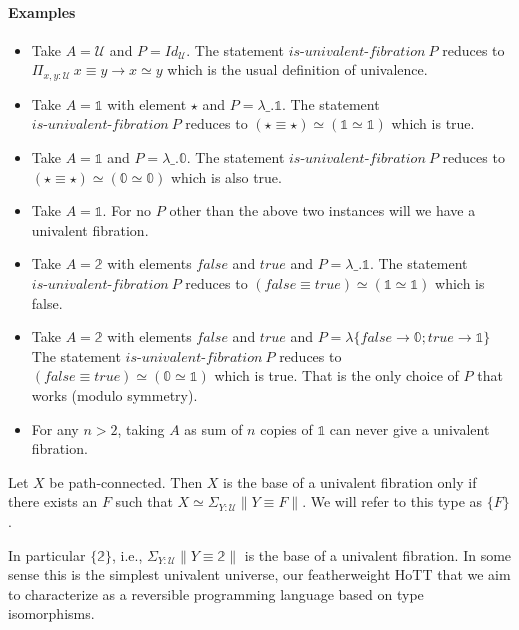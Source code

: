 \documentclass[format=acmlarge,review,natbib]{acmart}
\newcommand{\zt}{\mathbb{0}}
\newcommand{\ot}{\mathbb{1}}
\newcommand{\bt}{\mathbb{2}}
\newcommand{\fc}{\mathit{false}}
\newcommand{\tc}{\mathit{true}}
\begin{document}
\noindent\paragraph*{Examples}
\begin{itemize}
\item Take $A = \mathcal{U}$ and $P = \mathit{Id}_{\mathcal{U}}$. The statement
  $\textit{is-univalent-fibration}~P$ reduces to $\Pi_{x,y:\mathcal{U}}~x \equiv y \to
  x \simeq y$ which is the usual definition of univalence.

\newpage

\item Take $A = \ot$ with element $\star$ and $P = \lambda \_. \ot$. The
  statement $\textit{is-univalent-fibration}~P$ reduces to
  $(\star\equiv\star)\simeq(\ot\simeq\ot)$ which is true.
\item Take $A = \ot$ and $P = \lambda \_. \zt$. The statement
  $\textit{is-univalent-fibration}~P$ reduces to
  $(\star\equiv\star)\simeq(\zt\simeq\zt)$ which is also true.
\item Take $A = \ot$. For no $P$ other than the above two instances will
  we have a univalent fibration.
\item Take $A = \bt$ with elements $\fc$ and $\tc$ and
  $P = \lambda \_. \ot$. The statement
  $\textit{is-univalent-fibration}~P$ reduces to $(\fc \equiv \tc) \simeq
  (\ot\simeq\ot)$ which is false.
\item Take $A = \bt$ with elements $\fc$ and $\tc$ and
  $P = \lambda \{ \fc \to \zt; \tc \to \ot \}$ The statement
  $\textit{is-univalent-fibration}~P$ reduces to $(\fc \equiv \tc) \simeq
  (\zt\simeq\ot)$ which is true. That is the only choice of $P$
  that works (modulo symmetry).
\item For any $n > 2$, taking $A$ as sum of $n$ copies of $\ot$ can never
  give a univalent fibration.
\end{itemize}

\begin{theorem}
  Let $X$ be path-connected. Then $X$ is the base of a univalent fibration only
  if there exists an $F$ such that $X \simeq \Sigma_{Y : \mathcal{U}} \| Y \equiv F
  \|$. We will refer to this type as $\{F\}$.
\end{theorem}

\noindent In particular $\{\bt\}$, i.e.,
$\Sigma_{Y : \mathcal{U}} \| Y \equiv \bt \|$ is the base of a univalent
fibration. In some sense this is the simplest univalent universe, our
featherweight HoTT that we aim to characterize as a reversible programming
language based on type isomorphisms.
\end{document}
